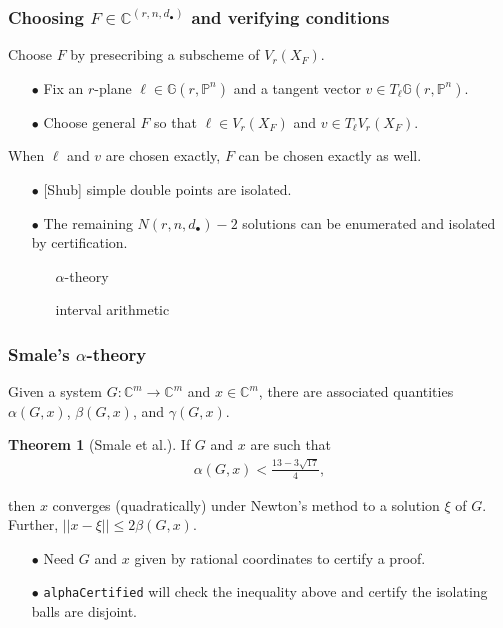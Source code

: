 \documentclass{beamer}
\theoremstyle{definition}
\newtheorem{thm}{Theorem}
\begin{document}
\begin{frame}
\frametitle{Choosing $F\in\mathbb{C}^{(r,n,d_\bullet)}$ and verifying conditions}
Choose $F$ by presecribing a subscheme of $V_r(X_F)$.
\begin{enumerate}
\item[$\bullet$] Fix an $r$-plane $\ell\in\mathbb{G}(r,\mathbb{P}^n)$ and a tangent vector $v\in T_\ell\mathbb{G}(r,\mathbb{P}^n)$. 

\item[$\bullet$] Choose general $F$ so that $\ell\in V_r(X_F)$ and $v\in T_\ell V_r(X_F)$.
\end{enumerate}

When $\ell$ and $v$ are chosen exactly, $F$ can be chosen exactly as well.
\begin{enumerate}
\item[$\bullet$] [Shub] simple double points are isolated.

\item[$\bullet$] The remaining $N(r,n,d_\bullet)-2$ solutions can be enumerated and isolated by certification.
\begin{enumerate}
\item[\scalebox{.7}{$\blacksquare$}] $\alpha$-theory

\item[\scalebox{.7}{$\blacksquare$}] interval arithmetic
\end{enumerate}
\end{enumerate}




\end{frame}






\begin{frame}
\frametitle{Smale's $\alpha$-theory}
Given a system $G:\mathbb{C}^m\to\mathbb{C}^m$ and $x\in\mathbb{C}^m$, there are associated quantities $\alpha(G,x)$, $\beta(G,x)$, and $\gamma(G,x)$. 

\begin{thm}[Smale et al.]
\vspace{-.1cm}
If $G$ and $x$ are such that
\vspace{-.2cm}
\begin{align*}
\alpha(G,x) < \frac{13-3\sqrt{17}}{4},
\end{align*}
\vspace{-.85cm}

then $x$ converges (quadratically) under Newton's method to a solution $\xi$ of $G$. Further, $||x-\xi||\le 2\beta(G,x)$.
\end{thm}

\begin{enumerate}
\item[$\bullet$] Need $G$ and $x$ given by rational coordinates to certify a proof.

\item[$\bullet$] \texttt{alphaCertified} will check the inequality above and certify the isolating balls are disjoint. 
\end{enumerate}
\end{frame}
\end{document}
